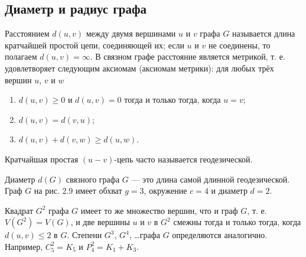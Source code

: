 \subsection{Диаметр и радиус графа}
Расстоянием $d(u, v)$ между двумя вершинами $u$ и $v$ графа $G$ называется длина кратчайшей простой цепи, соединяющей их; если $u$ и $v$ не соединены, то полагаем $d(u, v) = \infty$. В связном графе расстояние является метрикой, т. е. удовлетворяет следующим аксиомам (аксиомам метрики): для любых трёх вершин $u$, $v$ и $w$

\begin{enumerate}
    \item \(d(u, v) \geq 0\) и \(d(u, v) = 0\) тогда и только тогда, когда \(u = v\);
    \item \(d(u, v) = d(v, u)\);
    \item \(d(u, v) + d(v, w) \geq d(u, w)\).
\end{enumerate}

Кратчайшая простая $(u-v)$-цепь часто называется геодезической.

Диаметр $d(G)$ связного графа $G$ — это длина самой длинной геодезической. Граф $G$ на рис. 2.9 имеет обхват $g = 3$, окружение $c = 4$ и диаметр $d = 2$.

Квадрат $G^2$ графа $G$ имеет то же множество вершин, что и граф $G$, т. е. $V(G^2) = V(G)$, и две вершины $u$ и $v$ в $G^2$ смежны тогда и только тогда, когда $d(u, v) \leq 2$ в $G$. Степени $G^3$, $G^4$, \ldots графа $G$ определяются аналогично. Например, $C_5^2 = K_5$ и $P_4^2 = K_1 + K_3$.